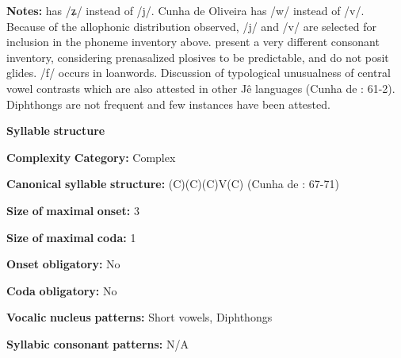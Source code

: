 \documentclass[output=paper]{langsci/langscibook}
\begin{document}
\begin{styleBody}
\textbf{Notes:} \citet{Ham2009} has /ʑ/ instead of /j/. Cunha de Oliveira has /w/ instead of /v/. Because of the allophonic distribution observed, /j/ and /v/ are selected for inclusion in the phoneme inventory above. \citet{BurgessHam1968} present a very different consonant inventory, considering prenasalized plosives to be predictable, and do not posit glides. /f/ occurs in loanwords. Discussion of typological unusualness of central vowel contrasts which are also attested in other Jê languages (Cunha de \citealt{Oliveira2005}: 61-2). Diphthongs are not frequent and few instances have been attested.
\end{styleBody}

\begin{styleBody}
\textbf{Syllable} \textbf{structure}
\end{styleBody}

\begin{styleBody}
\textbf{Complexity} \textbf{Category:} Complex
\end{styleBody}

\begin{styleBody}
\textbf{Canonical} \textbf{syllable} \textbf{structure:} (C)(C)(C)V(C) (Cunha de \citealt{Oliveira2005}: 67-71)
\end{styleBody}

\begin{styleBody}
\textbf{Size} \textbf{of} \textbf{maximal} \textbf{onset:} 3
\end{styleBody}

\begin{styleBody}
\textbf{Size} \textbf{of} \textbf{maximal} \textbf{coda:} 1
\end{styleBody}

\begin{styleBody}
\textbf{Onset} \textbf{obligatory:} No
\end{styleBody}

\begin{styleBody}
\textbf{Coda} \textbf{obligatory:} No
\end{styleBody}

\begin{styleBody}
\textbf{Vocalic} \textbf{nucleus} \textbf{patterns:} Short vowels, Diphthongs
\end{styleBody}

\begin{styleBody}
\textbf{Syllabic} \textbf{consonant} \textbf{patterns:} N/A
\end{styleBody}
\end{document}
